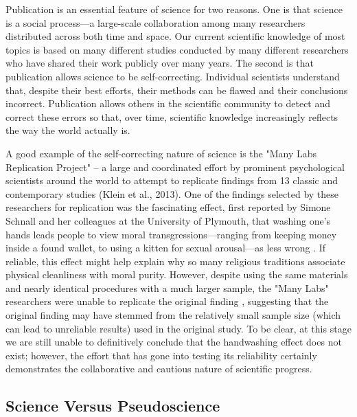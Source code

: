 Publication is an essential feature of science for two reasons. One is that science is a social process---a large-scale collaboration among many researchers distributed across both time and space. Our current scientific knowledge of most topics is based on many different studies conducted by many different researchers who have shared their work publicly over many years. The second is that publication allows science to be self-correcting. Individual scientists understand that, despite their best efforts, their methods can be flawed and their conclusions incorrect. Publication allows others in the scientific community to detect and correct these errors so that, over time, scientific knowledge increasingly reflects the way the world actually is.

A good example of the self-correcting nature of science is the "Many Labs Replication Project" -- a large and coordinated effort by prominent psychological scientists around the world to attempt to replicate findings from 13 classic and contemporary studies (Klein et al., 2013). One of the findings selected by these researchers for replication was the fascinating effect, first reported by Simone Schnall and her colleagues at the University of Plymouth, that washing one's hands leads people to view moral transgressions---ranging from keeping money inside a found wallet, to using a kitten for sexual arousal---as less wrong \citep{schnall_clean_2008}. If reliable, this effect might help explain why so many religious traditions associate physical cleanliness with moral purity. However, despite using the same materials and nearly identical procedures with a much larger sample, the "Many Labs" researchers were unable to replicate the original finding \citep{johnson_does_2014}, suggesting that the original finding may have stemmed from the relatively small sample size (which can lead to unreliable results) used in the original study. To be clear, at this stage we are still unable to definitively conclude that the handwashing effect does not exist; however, the effort that has gone into testing its reliability certainly demonstrates the collaborative and cautious nature of scientific progress.


\subsection{Science Versus Pseudoscience}

